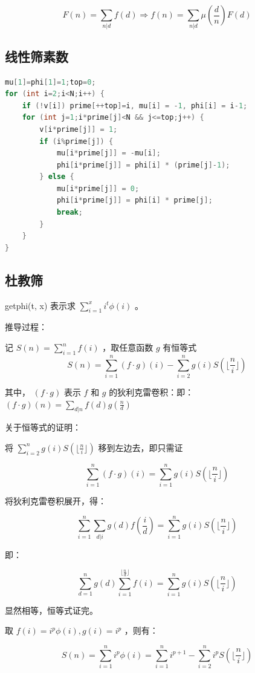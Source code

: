 \documentclass{article}
\begin{document}
$$F(n) = \sum\limits_{n|d}f(d) \Rightarrow f(n) = \sum\limits_{n|d} \mu(\frac{d}{n}) F(d) $$


\subsection{线性筛素数}
\begin{lstlisting}[language=C++]
mu[1]=phi[1]=1;top=0;
for (int i=2;i<N;i++) {
	if (!v[i]) prime[++top]=i, mu[i] = -1, phi[i] = i-1;
	for (int j=1;i*prime[j]<N && j<=top;j++) {
		v[i*prime[j]] = 1;
		if (i%prime[j]) {
			mu[i*prime[j]] = -mu[i];
			phi[i*prime[j]] = phi[i] * (prime[j]-1);
		} else {
			mu[i*prime[j]] = 0;
			phi[i*prime[j]] = phi[i] * prime[j];
			break;
		}
	}
}
\end{lstlisting}
\subsection{杜教筛}
getphi(t, x) 表示求 $\sum\limits_{i = 1}^{x} i^t \phi(i)$ 。

推导过程：

记 $S(n) = \sum\limits_{i = 1}^{n} f(i)$ ，取任意函数 $g$ 有恒等式
$$S(n) = \sum\limits_{i = 1}^{n} (f \cdot g) (i) - \sum\limits_{i = 2}^{n} g(i) S(\lfloor \frac{n}{i} \rfloor)$$

其中， $(f \cdot g)$ 表示 $f$ 和 $g$ 的狄利克雷卷积：即： $(f \cdot g) (n) = \sum\limits_{d | n} f(d)g(\frac{n}{d})$

关于恒等式的证明：

将 $\sum\limits_{i = 2}^{n} g(i)S(\lfloor \frac{n}{i} \rfloor)$ 移到左边去，即只需证

$$\sum\limits_{i = 1}^{n} (f \cdot g) (i) = \sum\limits_{i = 1}^{n} g(i) S(\lfloor \frac{n}{i} \rfloor)$$

将狄利克雷卷积展开，得：

$$\sum\limits_{i = 1}^{n} \sum\limits_{d | i} g(d) f(\frac{i}{d}) = \sum\limits_{i = 1}^{n} g(i) S(\lfloor \frac{n}{i} \rfloor)$$

即：

$$\sum\limits_{d = 1}^{n} g(d) \sum\limits_{i = 1}^{\lfloor \frac{n}{d} \rfloor} f(i) = \sum\limits_{i = 1}^{n} g(i) S(\lfloor \frac{n}{i} \rfloor)$$

显然相等，恒等式证完。

取 $f(i) = i^p \phi(i), g(i) = i^p$ ，则有：

$$S(n) = \sum\limits_{i = 1}^{n} i^p \phi(i) = \sum\limits_{i = 1}^{n} i^{p+1} - \sum\limits_{i = 2}^{n}i^pS(\lfloor \frac{n}{i} \rfloor)$$
\end{document}
